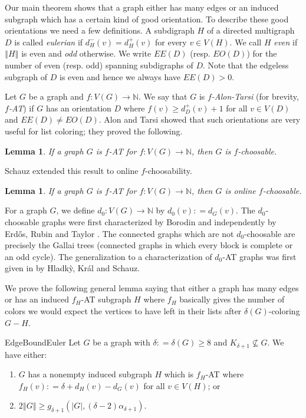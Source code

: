 \documentclass[12pt]{article}
\theoremstyle{plain}
\newtheorem{lem}[thm]{Lemma}
\theoremstyle{definition}
\theoremstyle{remark}
\newcommand{\IN}{\mathbb{N}}
\newcommand{\card}[1]{\left|#1\right|}
\newcommand{\size}[1]{\left\Vert#1\right\Vert}
\newcommand{\func}[3]{#1\colon #2 \rightarrow #3}
\newcommand{\DefinedAs}{\mathrel{\mathop:}=}
\begin{document}
Our main theorem shows that a graph either has many edges or an induced subgraph which has a certain kind of good orientation.  To describe these good orientations we need a few definitions. A subdigraph $H$ of a directed multigraph $D$ is called \emph{eulerian} if $d^-_H(v) = d^+_H(v)$ for every $v \in V(H)$.  We call $H$ \emph{even} if $\size{H}$ is even and \emph{odd} otherwise.  We write $EE(D)$ (resp. $EO(D)$) for the number of even (resp. odd) spanning subdigraphs of $D$.  Note that the edgeless subgraph of $D$ is even and hence we always have $EE(D) > 0$.

Let $G$ be a graph and $\func{f}{V(G)}{\IN}$.  We say that $G$ is \emph{$f$-Alon-Tarsi} (for brevity, \emph{$f$-AT}) if $G$ has an orientation $D$ where $f(v) \geq d_{D}^+(v) + 1$ for all $v \in V(D)$ and $EE(D) \neq EO(D)$.  Alon and Tarsi \cite{Alon1992125} showed that such orientations are very useful for list coloring; they proved the following.

\begin{lem}\label{AlonTarsi}
If a graph $G$ is $f$-AT for $\func{f}{V(G)}{\IN}$, then $G$ is $f$-choosable.
\end{lem}

\noindent Schauz \cite{schauz2010flexible} extended this result to online $f$-choosability.

\begin{lem}\label{Schauz}
If a graph $G$ is $f$-AT for $\func{f}{V(G)}{\IN}$, then $G$ is online $f$-choosable.
\end{lem}

For a graph $G$, we define $\func{d_0}{V(G)}{\IN}$ by $d_0(v) \DefinedAs d_G(v)$.  The $d_0$-choosable graphs were first characterized by Borodin \cite{borodin1977criterion} and independently by Erd\H{o}s, Rubin and Taylor \cite{erdos1979choosability}.  The connected graphs which are not $d_0$-choosable are precisely the Gallai trees (connected graphs in which every block is complete or an odd cycle). The generalization to a characterization of $d_0$-AT graphs was first given in \cite{Hladky} by Hladk{\`y}, Kr{\'a}l and Schauz. 

We prove the following general lemma saying that either a graph has many edges or has an induced $f_H$-AT subgraph $H$ where $f_H$ basically gives the number of colors we would expect the vertices to have left in their lists after $\delta(G)$-coloring $G-H$. 

\begin{repthm}{EdgeBoundEuler}
Let $G$ be a graph with $\delta \DefinedAs \delta(G) \geq 8$ and $K_{\delta + 1} \not \subseteq G$. We have either:
\begin{enumerate}
\item $G$ has a nonempty induced subgraph $H$ which is $f_H$-AT where $f_H(v) \DefinedAs \delta + d_H(v) - d_G(v)$ for all $v \in V(H)$; or
\item $2\size{G} \geq g_{\delta+1}(\card{G}, (\delta-2)\alpha_{\delta + 1})$.
\end{enumerate}
\end{repthm}
\end{document}
